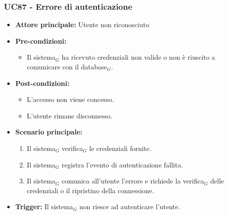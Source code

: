 \documentclass[a4paper, 10pt]{article}
\begin{document}
\subsubsection{UC87 - Errore di autenticazione}
\hypertarget{uc:87}{}
\begin{itemize}
    \item \textbf{Attore principale:} Utente non riconosciuto
    \item \textbf{Pre-condizioni:} 
        \begin{itemize}
            \item Il sistema$_G$ ha ricevuto credenziali non valide o non è riuscito a comunicare con il database$_G$.
        \end{itemize}
    \item \textbf{Post-condizioni:} 
        \begin{itemize}
            \item L'accesso non viene concesso.
            \item L'utente rimane disconnesso.
        \end{itemize}
    \item \textbf{Scenario principale:}
        \begin{enumerate}
            \item Il sistema$_G$ verifica$_G$ le credenziali fornite.
            \item Il sistema$_G$ registra l'evento di autenticazione fallita.
            \item Il sistema$_G$ comunica all'utente l'errore e richiede la verifica$_G$ delle credenziali o il ripristino della connessione.
        \end{enumerate}
    \item \textbf{Trigger:} Il sistema$_G$ non riesce ad autenticare l'utente.
\end{itemize}
\end{document}

